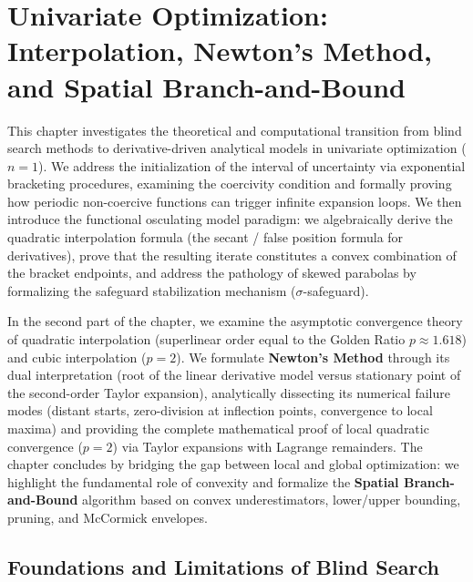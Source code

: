 \chapter[Univariate Optimization: Interpolation, Newton's Method, and Branch-and-Bound]{Univariate Optimization:\\Interpolation, Newton's Method, and Spatial Branch-and-Bound}
\label{chap:univariate-optimization-models-newton-branch-and-bound-en}

This chapter investigates the theoretical and computational transition from blind search methods to derivative-driven analytical models in univariate optimization ($n = 1$). We address the initialization of the interval of uncertainty via exponential bracketing procedures, examining the coercivity condition and formally proving how periodic non-coercive functions can trigger infinite expansion loops. We then introduce the functional osculating model paradigm: we algebraically derive the quadratic interpolation formula (the secant / false position formula for derivatives), prove that the resulting iterate constitutes a convex combination of the bracket endpoints, and address the pathology of skewed parabolas by formalizing the safeguard stabilization mechanism ($\sigma$-safeguard).

In the second part of the chapter, we examine the asymptotic convergence theory of quadratic interpolation (superlinear order equal to the Golden Ratio $p \approx 1.618$) and cubic interpolation ($p = 2$). We formulate \textbf{Newton's Method} through its dual interpretation (root of the linear derivative model versus stationary point of the second-order Taylor expansion), analytically dissecting its numerical failure modes (distant starts, zero-division at inflection points, convergence to local maxima) and providing the complete mathematical proof of local quadratic convergence ($p = 2$) via Taylor expansions with Lagrange remainders. The chapter concludes by bridging the gap between local and global optimization: we highlight the fundamental role of convexity and formalize the \textbf{Spatial Branch-and-Bound} algorithm based on convex underestimators, lower/upper bounding, pruning, and McCormick envelopes.

\FloatBarrier
\section{Foundations and Limitations of Blind Search}
\label{sec:univariate-blind-search-limits-en}

